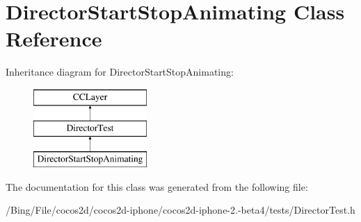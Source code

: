 \hypertarget{interface_director_start_stop_animating}{\section{Director\-Start\-Stop\-Animating Class Reference}
\label{interface_director_start_stop_animating}
}
Inheritance diagram for Director\-Start\-Stop\-Animating\-:\begin{figure}[H]
\begin{center}
\leavevmode
\includegraphics[height=3.000000cm]{interface_director_start_stop_animating}
\end{center}
\end{figure}


The documentation for this class was generated from the following file\-:\begin{DoxyCompactItemize}
\item 
/\-Bing/\-File/cocos2d/cocos2d-\/iphone/cocos2d-\/iphone-\/2.-\/beta4/tests/Director\-Test.\-h\end{DoxyCompactItemize}
